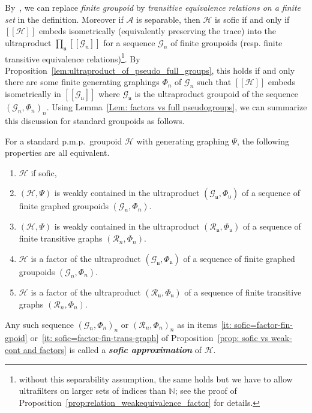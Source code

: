 \documentclass[AHL,Unicode,longabstracts,published]{cedram}
\newcommand{\defin}[1]{\textbf{\emph{#1}}}
\newcommand{\Nmath}{\mathbb{N}}
\newcommand{\RR}{\mathcal{R}}
\newcommand{\ch}{\mathcal{H}}
\newcommand{\cg}{\mathcal{G}}
\newcommand{\ra}{\mathscr{A}}
\newcommand{\ul}{\mathfrak{u}}
\newcommand{\pmp}{p.m.p.\ }
\begin{document}
By~\cite[Proposition~1.4]{Cordeiro-2017}, we can replace \emph{finite groupoid} by \emph{transitive equivalence relations on a finite set} in the definition. Moreover if $\ra$ is separable, then $\ch$ is sofic if and only if $[[\ch]]$ embeds isometrically (equivalently preserving the trace) into the ultraproduct $\prod_\ul[[\cg_n]]$ for a sequence $\cg_n$ of finite groupoids (resp. finite transitive equivalence relations)\footnote{without this separability assumption, the same holds but we have to allow ultrafilters on larger sets of indices than $\Nmath$; see the proof of Proposition~\ref{prop:relation_weakequivalence_factor} for details.}. By Proposition~\ref{lem:ultraproduct_of_pseudo_full_groups}, this holds if and only there are some finite generating graphings $\Phi_n$ of $\cg_n$ such that $[[\ch]]$ embeds isometrically in $[[\cg_\ul]]$ where $\cg_\ul$ is the ultraproduct groupoid of the sequence $(\cg_n,\Phi_n)_n$. Using Lemma~\ref{Lem: factors vs full pseudogroups}, we can summarize this discussion for standard groupoids as follows.

\begin{prop}\label{prop: sofic vs weak-cont and factors}
For a standard \pmp groupoid $\ch$ with generating graphing $\Psi$, the following properties are all equivalent.
\begin{enumerate}
\item \label{prop3.34.1}$\ch$ if sofic,
\item \label{prop3.34.2}$(\ch,\Psi)$ is weakly contained in the ultraproduct $(\cg_\ul,\Phi_\ul)$ of a sequence of finite graphed groupoids $(\cg_n,\Phi_n)$.
\item \label{prop3.34.3}$(\ch,\Psi)$ is weakly contained in the ultraproduct $(\RR_\ul,\Phi_\ul)$ of a sequence of finite transitive graphs $(\RR_n,\Phi_n)$.
\item \label{it: sofic=factor-fin-gpoid}
$\ch$ is a factor of the ultraproduct $(\cg_\ul,\Phi_\ul)$ of a sequence of finite graphed groupoids $(\cg_n,\Phi_n)$.
\item\label{it: sofic=factor-fin-trans-graph}
$\ch$ is a factor of the ultraproduct $(\RR_\ul,\Phi_\ul)$ of a sequence of finite transitive graphs $(\RR_n,\Phi_n)$.
\end{enumerate}
\end{prop}

Any such sequence $(\cg_n,\Phi_n)_n$ or $(\RR_n,\Phi_n)_n$ as in items~\eqref{it: sofic=factor-fin-gpoid} or~\eqref{it: sofic=factor-fin-trans-graph} of Proposition~\ref{prop: sofic vs weak-cont and factors} is called a
\defin{sofic approximation} of $\ch$.
\end{document}
